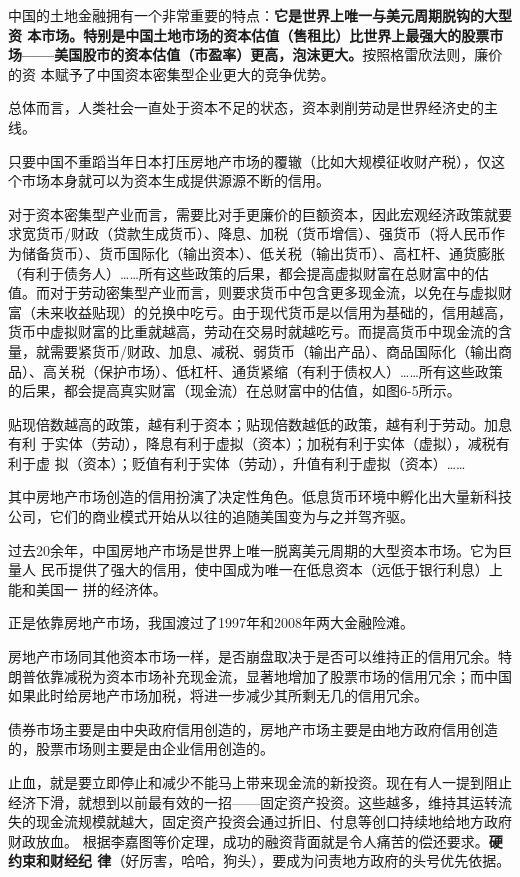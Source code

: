 中国的土地金融拥有一个非常重要的特点：\textbf{它是世界上唯一与美元周期脱钩的大型资
  本市场。特别是中国土地市场的资本估值（售租比）比世界上最强大的股票市
  场——美国股市的资本估值（市盈率）更高，泡沫更大。}按照格雷欣法则，廉价的资
本赋予了中国资本密集型企业更大的竞争优势。

总体而言，人类社会一直处于资本不足的状态，资本剥削劳动是世界经济史的主线。

只要中国不重蹈当年日本打压房地产市场的覆辙（比如大规模征收财产税），仅这个市场本身就可以为资本生成提供源源不断的信用。

对于资本密集型产业而言，需要比对手更廉价的巨额资本，因此宏观经济政策就要求宽货币/财政（贷款生成货币）、降息、加税（货币增信）、强货币（将人民币作为储备货币）、货币国际化（输出资本）、低关税（输出货币）、高杠杆、通货膨胀（有利于债务人）……所有这些政策的后果，都会提高虚拟财富在总财富中的估值。而对于劳动密集型产业而言，则要求货币中包含更多现金流，以免在与虚拟财富（未来收益贴现）的兑换中吃亏。由于现代货币是以信用为基础的，信用越高，货币中虚拟财富的比重就越高，劳动在交易时就越吃亏。而提高货币中现金流的含量，就需要紧货币/财政、加息、减税、弱货币（输出产品）、商品国际化（输出商品）、高关税（保护市场）、低杠杆、通货紧缩（有利于债权人）……所有这些政策的后果，都会提高真实财富（现金流）在总财富中的估值，如图6-5所示。


贴现倍数越高的政策，越有利于资本；贴现倍数越低的政策，越有利于劳动。加息有利
于实体（劳动），降息有利于虚拟（资本）；加税有利于实体（虚拟），减税有利于虚
拟（资本）；贬值有利于实体（劳动），升值有利于虚拟（资本）……

其中房地产市场创造的信用扮演了决定性角色。低息货币环境中孵化出大量新科技公司，它们的商业模式开始从以往的追随美国变为与之并驾齐驱。

过去20余年，中国房地产市场是世界上唯一脱离美元周期的大型资本市场。它为巨量人
民币提供了强大的信用，使中国成为唯一在低息资本（远低于银行利息）上能和美国一
拼的经济体。

正是依靠房地产市场，我国渡过了1997年和2008年两大金融险滩。

房地产市场同其他资本市场一样，是否崩盘取决于是否可以维持正的信用冗余。特朗普依靠减税为资本市场补充现金流，显著地增加了股票市场的信用冗余；而中国如果此时给房地产市场加税，将进一步减少其所剩无几的信用冗余。

债券市场主要是由中央政府信用创造的，房地产市场主要是由地方政府信用创造的，股票市场则主要是由企业信用创造的。

止血，就是要立即停止和减少不能马上带来现金流的新投资。现在有人一提到阻止经济下滑，就想到以前最有效的一招——固定资产投资。这些越多，维持其运转流失的现金流规模就越大，固定资产投资会通过折旧、付息等创口持续地给地方政府财政放血。
根据李嘉图等价定理，成功的融资背面就是令人痛苦的偿还要求。\textbf{硬约束和财经纪
  律}（好厉害，哈哈，狗头），要成为问责地方政府的头号优先依据。

